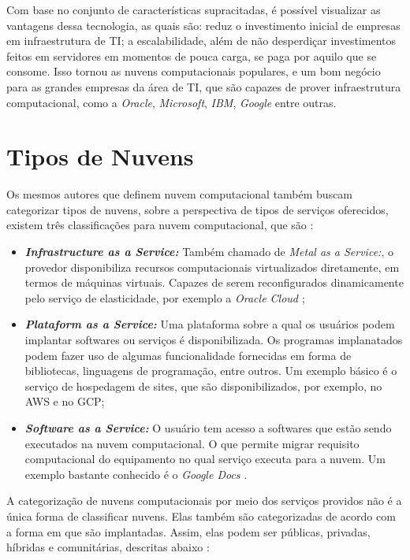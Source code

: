 Com base no conjunto de características supracitadas, é possível visualizar as vantagens dessa tecnologia, as quais são: reduz o investimento inicial de empresas em infraestrutura de TI; a escalabilidade, além de não desperdiçar investimentos feitos em servidores em momentos de pouca carga, se paga por aquilo que se consome. Isso tornou as nuvens computacionais populares, e um bom negócio para as grandes empresas da área de \acrfull{TI}, que são capazes de prover infraestrutura computacional, como a \textit{Oracle}, \textit{Microsoft}, \textit{IBM}, \textit{Google} entre outras.

\section{Tipos de Nuvens}

Os mesmos autores que definem nuvem computacional também buscam categorizar tipos de nuvens, sobre a perspectiva de tipos de serviços oferecidos, existem três classificações para nuvem computacional, que são \cite{NIST_CLOUD_DEFINITION} \cite{Vaquero:2008:BCT:1496091.1496100_Cloud_definition}:

\begin{itemize}
	\item \textbf{\textit{Infrastructure as a Service:}} Também chamado de \textit{Metal as a Service:}, o provedor disponibiliza recursos computacionais virtualizados diretamente, em termos de máquinas virtuais. Capazes de serem reconfigurados dinamicamente pelo serviço de elasticidade, por exemplo a \textit{Oracle Cloud} \cite{OracleCloud};
	\item \textbf{\textit{Plataform as a Service:}} Uma plataforma sobre a qual os usuários podem implantar softwares ou serviços é disponibilizada. Os programas implanatados podem fazer uso de algumas funcionalidade fornecidas em forma de bibliotecas, linguagens de programação, entre outros. Um exemplo básico é o serviço de hospedagem de sites, que são disponibilizados, por exemplo, no \acrfull{AWS} e no \acrfull{GCP};
	\item \textbf{\textit{Software as a Service:}} O usuário tem acesso a softwares que estão sendo executados na nuvem computacional. O que permite migrar requisito computacional do equipamento no qual serviço executa para a nuvem. Um exemplo bastante conhecido é o \textit{Google Docs} \cite{GoogleDocs}.
\end{itemize}

A categorização de nuvens computacionais por meio dos serviços providos não é a única forma de classificar nuvens. Elas também são categorizadas de acordo com a forma em que são implantadas. Assim, elas podem ser públicas, privadas, híbridas e comunitárias, descritas abaixo \cite{NIST_CLOUD_DEFINITION}:

